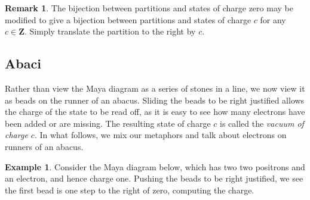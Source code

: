 \documentclass{amsart}[12pt]
\theoremstyle{definition}
\newtheorem{example}[dummy]{Example}
\newtheorem{remark}[dummy]{Remark}
\newcommand{\Z}{\mathbf{Z}}
\begin{document}
\begin{remark} \label{remark:nonzerocharge}
The bijection between partitions and states of charge zero may be modified to give a bijection between partitions and states of charge $c$ for any $c\in\Z$.   Simply translate the partition to the right by $c$.



\subsection{Abaci}

Rather than view the Maya diagram as a series of stones in a line, we
now view it as beads on the runner of an abacus.  Sliding the beads
to be right justified allows the charge of the state to be read off,
as it is easy to see how many electrons have been added or are missing.  The resulting state of charge $c$ is called the \emph{vacuum of charge $c$}.  In what follows, we mix our metaphors and talk about electrons on runners of an abacus.

\begin{example} \label{ex:mayabijection}
Consider the Maya diagram below, which has two two positrons and an electron, and hence charge one.  Pushing the beads to be right justified, we see the first bead is one step to the right of zero, computing the charge.

\begin{center}
\end{center}
\end{example}
\end{remark}
\end{document}
